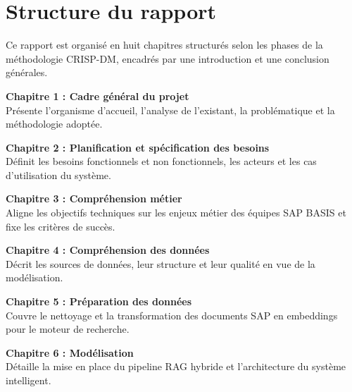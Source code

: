
\chapter*{Structure du rapport}

Ce rapport est organisé en huit chapitres structurés selon les phases de la méthodologie
CRISP-DM, encadrés par une introduction et une conclusion générales.

\vspace{0.3cm}

\noindent\textbf{\color{primaryblue}Chapitre 1 : Cadre général du projet}\\
Présente l'organisme d'accueil, l'analyse de l'existant, la problématique et la méthodologie adoptée.

\vspace{0.2cm}

\noindent\textbf{\color{primaryblue}Chapitre 2 : Planification et spécification des besoins}\\
Définit les besoins fonctionnels et non fonctionnels, les acteurs et les cas d'utilisation du système.

\vspace{0.2cm}

\noindent\textbf{\color{primaryblue}Chapitre 3 : Compréhension métier}\\
Aligne les objectifs techniques sur les enjeux métier des équipes SAP BASIS et fixe les critères de succès.

\vspace{0.2cm}

\noindent\textbf{\color{primaryblue}Chapitre 4 : Compréhension des données}\\
Décrit les sources de données, leur structure et leur qualité en vue de la modélisation.

\vspace{0.2cm}

\noindent\textbf{\color{primaryblue}Chapitre 5 : Préparation des données}\\
Couvre le nettoyage et la transformation des documents SAP en embeddings pour le moteur de recherche.

\vspace{0.2cm}

\noindent\textbf{\color{primaryblue}Chapitre 6 : Modélisation}\\
Détaille la mise en place du pipeline RAG hybride et l'architecture du système intelligent.

